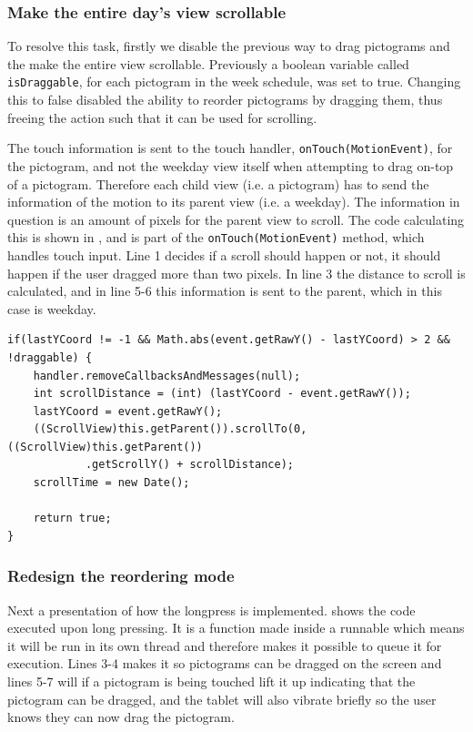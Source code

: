 \subsubsection*{Make the entire day's view scrollable}
To resolve this task, firstly we disable the previous way to drag pictograms and the make the entire view scrollable.
Previously a boolean variable called \texttt{isDraggable}, for each pictogram in the week schedule, was set to true.
Changing this to false disabled the ability to reorder pictograms by dragging them, thus freeing the action such that it can be used for scrolling.

The touch information is sent to the touch handler, \texttt{onTouch(MotionEvent)}, for the pictogram, and not the weekday view itself when attempting to drag on-top of a pictogram.
Therefore each child view (i.e. a pictogram) has to send the information of the motion to its parent view (i.e. a weekday).
The information in question is an amount of pixels for the parent view to scroll.
The code calculating this is shown in , and is part of the \texttt{onTouch(MotionEvent)} method, which handles touch input.
Line 1 decides if a scroll should happen or not, it should happen if the user dragged more than two pixels.
In line 3 the distance to scroll is calculated, and in line 5-6 this information is sent to the parent, which in this case is weekday.

\begin{lstlisting}[float, floatplacement=h, caption={The code executed when someone performs a move action.}, label={lst:actionmove}]
if(lastYCoord != -1 && Math.abs(event.getRawY() - lastYCoord) > 2 && !draggable) {
    handler.removeCallbacksAndMessages(null);
    int scrollDistance = (int) (lastYCoord - event.getRawY());
    lastYCoord = event.getRawY();
    ((ScrollView)this.getParent()).scrollTo(0, ((ScrollView)this.getParent())
            .getScrollY() + scrollDistance);
    scrollTime = new Date();

    return true;
}
\end{lstlisting}

\subsubsection*{Redesign the reordering mode}
Next a presentation of how the longpress is implemented.
 shows the code executed upon long pressing.
It is a function made inside a runnable which means it will be run in its own thread and therefore makes it possible to queue it for execution.
Lines 3-4 makes it so pictograms can be dragged on the screen and lines 5-7 will if a pictogram is being touched lift it up indicating that the pictogram can be dragged, and the tablet will also vibrate briefly so the user knows they can now drag the pictogram.

